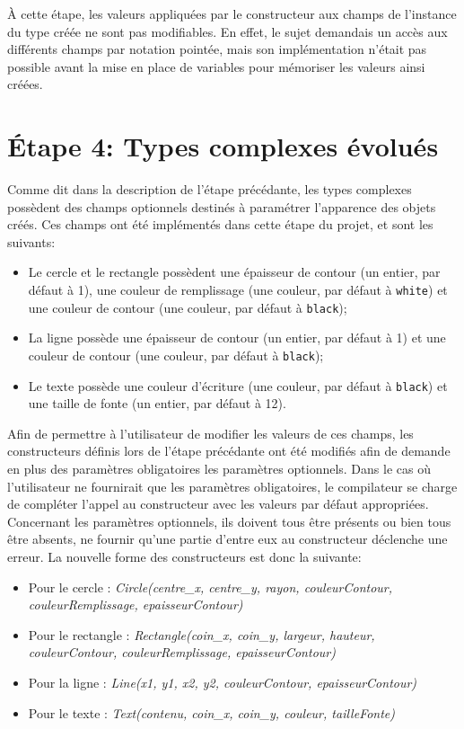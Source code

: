 \documentclass[a4paper, 12pt]{report}
\begin{document}
	\`A cette étape, les valeurs appliquées par le constructeur aux champs de l'instance du type créée ne sont pas modifiables. En effet, le sujet demandais un accès aux différents champs par notation pointée, mais son implémentation n'était pas possible avant la mise en place de variables pour mémoriser les valeurs ainsi créées.
        
\chapter{\'Etape 4: Types complexes évolués}

	Comme dit dans la description de l'étape précédante, les types complexes possèdent des champs optionnels destinés à paramétrer l'apparence des objets créés. Ces champs ont été implémentés dans cette étape du projet, et sont les suivants:\\
	
	\begin{itemize}
		\item Le cercle et le rectangle possèdent une épaisseur de contour (un entier, par défaut à 1), une couleur de remplissage (une couleur, par défaut à \texttt{white}) et une couleur de contour (une couleur, par défaut à \texttt{black});
		\item La ligne possède une épaisseur de contour (un entier, par défaut à 1) et une couleur de contour (une couleur, par défaut à \texttt{black});
		\item Le texte possède une couleur d'écriture (une couleur, par défaut à \texttt{black}) et une taille de fonte (un entier, par défaut à 12).\\
	\end{itemize}
	
	Afin de permettre à l'utilisateur de modifier les valeurs de ces champs, les constructeurs définis lors de l'étape précédante ont été modifiés afin de demande en plus des paramètres obligatoires les paramètres optionnels. Dans le cas où l'utilisateur ne fournirait que les paramètres obligatoires, le compilateur se charge de compléter l'appel au constructeur avec les valeurs par défaut appropriées. Concernant les paramètres optionnels, ils doivent tous être présents ou bien tous être absents, ne fournir qu'une partie d'entre eux au constructeur déclenche une erreur. La nouvelle forme des constructeurs est donc la suivante:\\
	
	\begin{itemize}
		\item Pour le cercle : \textit{Circle(centre\_x, centre\_y, rayon, couleurContour, couleurRemplissage, epaisseurContour)}
		\item Pour le rectangle : \textit{Rectangle(coin\_x, coin\_y, largeur, hauteur, couleurContour, couleurRemplissage, epaisseurContour)}
		\item Pour la ligne : \textit{Line(x1, y1, x2, y2, couleurContour, epaisseurContour)}
		\item Pour le texte : \textit{Text(contenu, coin\_x, coin\_y, couleur, tailleFonte)}
	\end{itemize}
	
\end{document}
